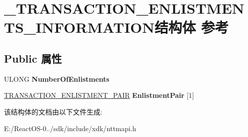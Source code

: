 \hypertarget{struct___t_r_a_n_s_a_c_t_i_o_n___e_n_l_i_s_t_m_e_n_t_s___i_n_f_o_r_m_a_t_i_o_n}{}\section{\+\_\+\+T\+R\+A\+N\+S\+A\+C\+T\+I\+O\+N\+\_\+\+E\+N\+L\+I\+S\+T\+M\+E\+N\+T\+S\+\_\+\+I\+N\+F\+O\+R\+M\+A\+T\+I\+O\+N结构体 参考}
\label{struct___t_r_a_n_s_a_c_t_i_o_n___e_n_l_i_s_t_m_e_n_t_s___i_n_f_o_r_m_a_t_i_o_n}
\subsection*{Public 属性}
\begin{DoxyCompactItemize}
\item 
\mbox{\label{struct___t_r_a_n_s_a_c_t_i_o_n___e_n_l_i_s_t_m_e_n_t_s___i_n_f_o_r_m_a_t_i_o_n_a00fa4b8989a6aa406644551006f78682}} 
U\+L\+O\+NG {\bfseries Number\+Of\+Enlistments}
\item 
\mbox{\label{struct___t_r_a_n_s_a_c_t_i_o_n___e_n_l_i_s_t_m_e_n_t_s___i_n_f_o_r_m_a_t_i_o_n_a51209fa6b03116d643afeb4455ae0542}} 
\hyperlink{struct___t_r_a_n_s_a_c_t_i_o_n___e_n_l_i_s_t_m_e_n_t___p_a_i_r}{T\+R\+A\+N\+S\+A\+C\+T\+I\+O\+N\+\_\+\+E\+N\+L\+I\+S\+T\+M\+E\+N\+T\+\_\+\+P\+A\+IR} {\bfseries Enlistment\+Pair} \mbox{[}1\mbox{]}
\end{DoxyCompactItemize}


该结构体的文档由以下文件生成\+:\begin{DoxyCompactItemize}
\item 
E\+:/\+React\+O\+S-\/0../sdk/include/xdk/nttmapi.\+h\end{DoxyCompactItemize}
